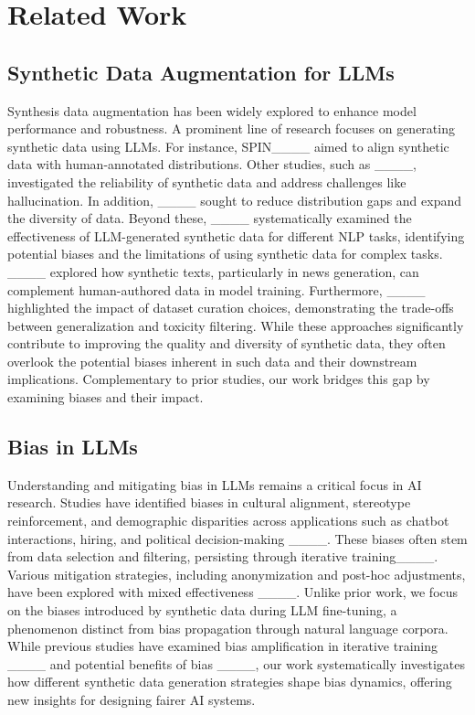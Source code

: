 \section{Related Work}
\label{sec:related}

\subsection{Synthetic Data Augmentation for LLMs}
Synthesis data augmentation has been widely explored to enhance model performance and robustness. A prominent line of research focuses on generating synthetic data using LLMs. For instance, SPIN____ aimed to align synthetic data with human-annotated distributions. Other studies, such as ____, investigated the reliability of synthetic data and address challenges like hallucination. In addition, ____ sought to reduce distribution gaps and expand the diversity of data. Beyond these, ____ systematically examined the effectiveness of LLM-generated synthetic data for different NLP tasks, identifying potential biases and the limitations of using synthetic data for complex tasks. ____ explored how synthetic texts, particularly in news generation, can complement human-authored data in model training. Furthermore, ____ highlighted the impact of dataset curation choices, demonstrating the trade-offs between generalization and toxicity filtering. While these approaches significantly contribute to improving the quality and diversity of synthetic data, they often overlook the potential biases inherent in such data and their downstream implications. 
Complementary to prior studies, our work bridges this gap by examining biases and their impact.


\subsection{Bias in LLMs}

Understanding and mitigating bias in LLMs remains a critical focus in AI research. Studies have identified biases in cultural alignment, stereotype reinforcement, and demographic disparities across applications such as chatbot interactions, hiring, and political decision-making ____. These biases often stem from data selection and filtering, persisting through iterative training____. Various mitigation strategies, including anonymization and post-hoc adjustments, have been explored with mixed effectiveness ____. Unlike prior work, we focus on the biases introduced by synthetic data during LLM fine-tuning, a phenomenon distinct from bias propagation through natural language corpora. While previous studies have examined bias amplification in iterative training ____ and potential benefits of bias ____, our work systematically investigates how different synthetic data generation strategies shape bias dynamics, offering new insights for designing fairer AI systems.

